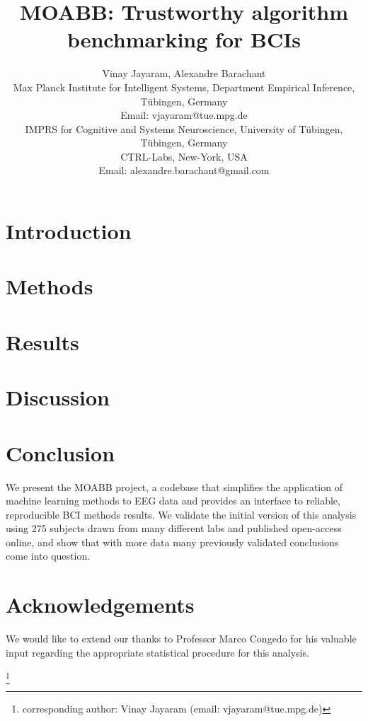 \documentclass[journal]{IEEEtran}
\title{MOABB: Trustworthy algorithm benchmarking for BCIs}
\author{
  \IEEEauthorblockN
  {
    Vinay Jayaram\IEEEauthorrefmark{1}\IEEEauthorrefmark{2},
    Alexandre Barachant\IEEEauthorrefmark{3}
  }

  \IEEEauthorblockA
  {
    \IEEEauthorrefmark{1}
    Max Planck Institute for Intelligent Systems, 
    Department Empirical Inference, 
    T\"{u}bingen, Germany \\
    Email: vjayaram@tue.mpg.de}
  
  \IEEEauthorblockA
  {
    \IEEEauthorrefmark{2}
    IMPRS for Cognitive and Systems Neuroscience, 
    University of T\"{u}bingen, 
    T\"{u}bingen, Germany \\
  }
  \IEEEauthorblockA
  {
    \IEEEauthorrefmark{3}
    CTRL-Labs,
    New-York, USA \\
    Email: alexandre.barachant@gmail.com
  }
}
\newcommand\blfootnote[1]{%
  \begingroup
  \renewcommand\thefootnote{}\footnote{#1}%
  \addtocounter{footnote}{-1}%
  \endgroup
}
\begin{document}
\maketitle
\begin{abstract}
  
\end{abstract}
\section{Introduction}

\section{Methods}

\section{Results}

\section{Discussion}

\section{Conclusion}
We present the MOABB project, a codebase that simplifies the application of
machine learning methods to EEG data and provides an interface to reliable,
reproducible BCI methods results. We validate the initial version of this
analysis using 275 subjects drawn from many different labs and published
open-access online, and show that with more data many previously validated
conclusions come into question.

\section*{Acknowledgements}
We would like to extend our thanks to Professor Marco Congedo for his valuable
input regarding the appropriate statistical procedure for this analysis.

\blfootnote{corresponding author: Vinay Jayaram (email: vjayaram@tue.mpg.de)}
\printbibliography
\end{document}
